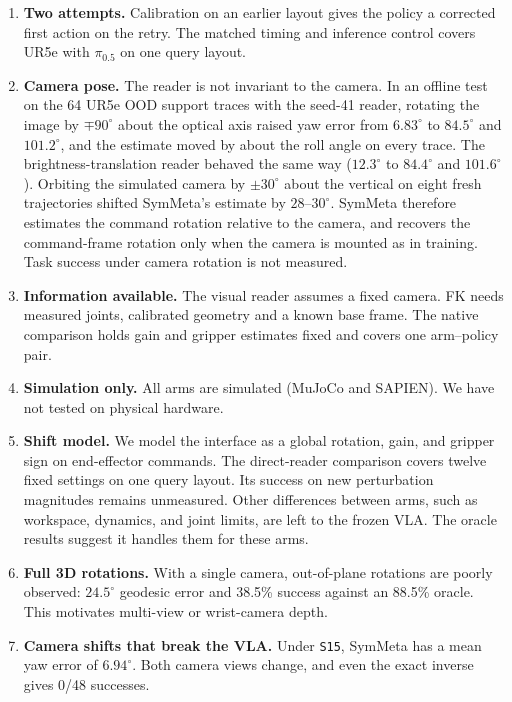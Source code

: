 \documentclass{article}
\theoremstyle{plain}
\theoremstyle{remark}
\begin{document}
\begin{enumerate}
  \item \textbf{Two attempts.} Calibration on an earlier layout gives the policy a corrected first action on the retry. The matched timing and inference control covers UR5e with $\pi_{0.5}$ on one query layout.
  \item \textbf{Camera pose.} The reader is not invariant to the camera. In an offline test on the 64 UR5e OOD support traces with the seed-41 reader, rotating the image by $\mp 90^\circ$ about the optical axis raised yaw error from $6.83^\circ$ to $84.5^\circ$ and $101.2^\circ$, and the estimate moved by about the roll angle on every trace. The brightness-translation reader behaved the same way ($12.3^\circ$ to $84.4^\circ$ and $101.6^\circ$). Orbiting the simulated camera by $\pm 30^\circ$ about the vertical on eight fresh trajectories shifted SymMeta's estimate by $28$--$30^\circ$. SymMeta therefore estimates the command rotation relative to the camera, and recovers the command-frame rotation only when the camera is mounted as in training. Task success under camera rotation is not measured.
  \item \textbf{Information available.} The visual reader assumes a fixed camera. FK needs measured joints, calibrated geometry and a known base frame. The native comparison holds gain and gripper estimates fixed and covers one arm--policy pair.
  \item \textbf{Simulation only.} All arms are simulated (MuJoCo and SAPIEN). We have not tested on physical hardware.
  \item \textbf{Shift model.} We model the interface as a global rotation, gain, and gripper sign on end-effector commands. The direct-reader comparison covers twelve fixed settings on one query layout. Its success on new perturbation magnitudes remains unmeasured. Other differences between arms, such as workspace, dynamics, and joint limits, are left to the frozen VLA. The oracle results suggest it handles them for these arms.
  \item \textbf{Full 3D rotations.} With a single camera, out-of-plane rotations are poorly observed: $24.5^\circ$ geodesic error and 38.5\% success against an 88.5\% oracle. This motivates multi-view or wrist-camera depth.
  \item \textbf{Camera shifts that break the VLA.} Under \texttt{S15}, SymMeta has a mean yaw error of $6.94^\circ$. Both camera views change, and even the exact inverse gives 0/48 successes.
\end{enumerate}
\end{document}
